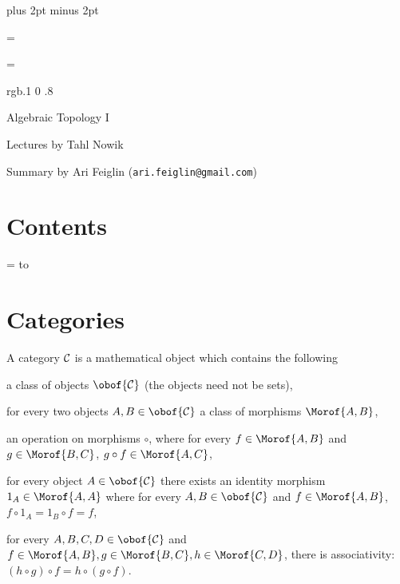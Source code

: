 

\parindent=0pt
\parskip=3pt plus 2pt minus 2pt



\footline={}


\headline={}

\color rgb{.1 0 .8}

{\def\boxshadowcolor{rgb{.3 .3 .8}}

    \centerline{Algebraic Topology I}
    \smallskip
    \centerline{Lectures by Tahl Nowik}
    \centerline{Summary by Ari Feiglin ({\tt ari.feiglin@gmail.com})}

\eppbox

\bigskip

    \section*{Contents}
    
    \tableofcontents
\eppbox

}

\vfill\break

\color{black}

\newif\ifpageodd
\pageoddtrue
\headline={%
    \hbox to \hsize{\color{black}%
        \ifpageodd\hfil{\it\currsubsection\quad\bf\folio}\global\pageoddfalse%
        \else{\bf\folio\quad\it\currsubsection}\hfil\global\pageoddtrue\fi%
    }%
}

\section{Categories}

\bdefn

    A {\emphcolor category} ${\cal C}$ is a mathematical object which contains the following
    \benum
        \item a class of objects $\obof{\cal C}$ (the objects need not be sets),
        \item for every two objects $A,B\in\obof{\cal C}$ a class of {\emphcolor morphisms} $\Morof{A,B}$,
        \item an operation on morphisms $\circ$, where for every $f\in\Morof{A,B}$ and $g\in\Morof{B,C}$, $g\circ f\in\Morof{A,C}$,
        \item for every object $A\in\obof{\cal C}$ there exists an identity morphism $1_A\in\Morof{A,A}$ where for every $A,B\in\obof{\cal C}$ and $f\in\Morof{A,B}$, $f\circ 1_A=1_B\circ f=f$,
        \item for every $A,B,C,D\in\obof{\cal C}$ and $f\in\Morof{A,B},g\in\Morof{B,C},h\in\Morof{C,D}$, there is associativity: $(h\circ g)\circ f=h\circ (g\circ f)$.
    \eenum

